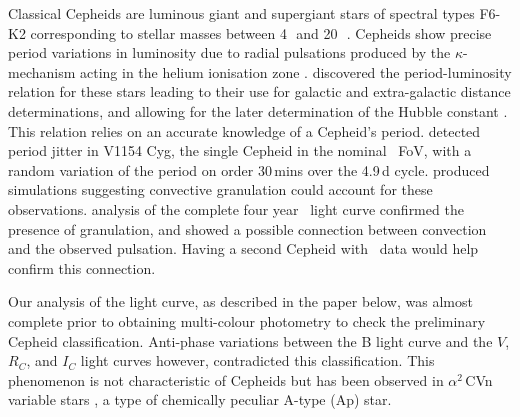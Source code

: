 Classical Cepheids are luminous giant and supergiant stars of spectral types F6-K2 \citep{rodgers_radius_1957} corresponding to stellar masses between 4\,\Msol~and 20\,\Msol~\citep{turner_progenitors_1996}. %
Cepheids show precise period variations in luminosity due to radial pulsations produced by the $\kappa$-mechanism acting in the helium ionisation zone \citep{eddington_pulsation_1917}. \citet{leavitt_1777_1908} discovered the period-luminosity relation for these stars leading to their use for galactic and extra-galactic distance determinations, and allowing for the later determination of the Hubble constant \citep{freedman_final_2001}. This relation relies on an accurate knowledge of a Cepheid's period. \citet{derekas_period_2012} detected period jitter in V1154 Cyg, the single Cepheid in the nominal \Kepler~FoV, with a random variation of the period on order 30\,mins over the 4.9\,d cycle. \citet{neilson_period_2016} produced simulations suggesting convective granulation could account for these observations. \citet{derekas_kepler_2017} analysis of the complete four year \Kepler~light curve confirmed the presence of granulation, and showed a possible connection between convection and the observed pulsation. Having a second Cepheid with \Kepler~data would help confirm this connection. 

Our analysis of the light curve, as described in the paper below, was almost complete prior to obtaining multi-colour photometry to check the preliminary Cepheid classification. Anti-phase variations between the B light curve and the $V$, $R_C$, and $I_C$ light curves however, contradicted this classification. This phenomenon is not characteristic of Cepheids but has been observed in $\alpha^2\,$CVn variable stars \citep{kurtz_determination_1996}, a type of chemically peculiar A-type (Ap) star. 


